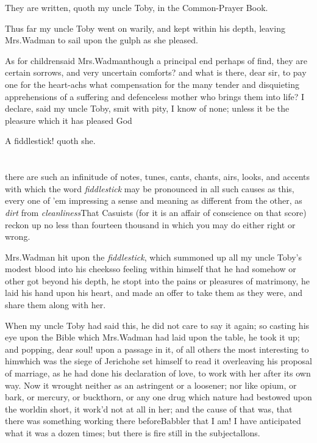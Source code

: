 \documentclass[twoside]{article}
\begin{document}
\tsh They are written, quoth my uncle Toby, in
the Common-Prayer Book.


Thus far my uncle Toby went on warily, and kept within
his depth, leaving Mrs.\@ Wadman to sail upon the gulph as she
pleased.

\etp
\tsk As for children\tsk said Mrs.\@ Wadman\tsk though a principal end perhaps of\break 
{}
find, they are certain sorrows, and very uncertain comforts? and what is there,
dear sir, to pay one for the heart-achs\tsk\break
what compensation for the many tender and
disquieting apprehensions of a suffering and defenceless mother who brings them into
life? I declare, said my uncle Toby, smit with pity, I know of none; unless it be
the pleasure which it has pleased God\tsh

\tsh A fiddlestick! quoth she.

\vfill{}\eject
\null{}\baselineskip
\section{}

 there are such an infinitude of
notes, tunes, cants, chants, airs, looks, and accents with which
the word \textit{fiddlestick} may be pronounced in all
such causes as this, every one of ’em impressing a sense and
meaning as different from the other, as \textit{dirt} from
\textit{cleanliness}\break\tsk That Casuists (for it is an affair of
conscience on that score) reckon up no less than fourteen thousand
in which you may do either right or wrong.

Mrs.\@ Wadman hit upon the \textit{fiddlestick}, which
summoned up all my uncle Toby’s modest blood into his
cheeks\tsk so feeling within himself that he had somehow or other
got beyond his depth, he stopt\etp{}
into the pains or pleasures of matrimony, he laid his hand
upon his heart, and made an offer to take them as they were, and
share them along with her.

When my uncle Toby had said this, he did not care to say
it again; so casting his eye upon the Bible which 
Mrs.\@ Wadman had laid upon the table, he took it up; and popping,
dear soul! upon a passage in it, of all others the most interesting
to him\tsk which was the siege of Jericho\tsk he set
himself to read it over\tsk leaving his proposal of marriage, as he had done his declaration of love, to work with
her after its own way. Now it wrought neither as an astringent or a
loosener; nor like opium, or bark, or mercury, or buckthorn, or any
one\etp{} drug which nature had bestowed upon the world\tsk in short,
it work’d not at all in her; and the cause of that was, that
there was something working there before\tsh Babbler that
I am! I have anticipated what it was a dozen times; but there is
fire still in the subject\tsh\break allons.
\end{document}
